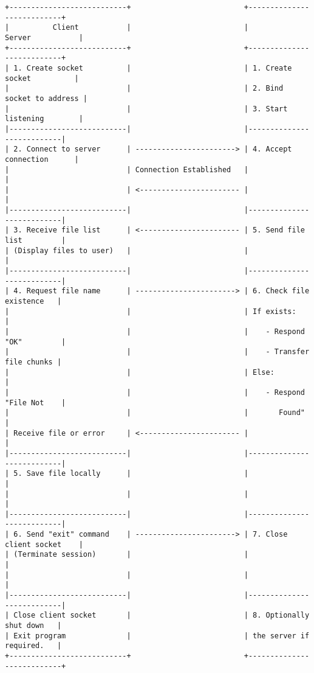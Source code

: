 \documentclass{article}
\begin{document}
\begin{verbatim}
+---------------------------+                          +---------------------------+
|          Client           |                          |          Server           |
+---------------------------+                          +---------------------------+
| 1. Create socket          |                          | 1. Create socket          |
|                           |                          | 2. Bind socket to address |
|                           |                          | 3. Start listening        |
|---------------------------|                          |---------------------------|
| 2. Connect to server      | -----------------------> | 4. Accept connection      |
|                           | Connection Established   |                           |
|                           | <----------------------- |                           |
|---------------------------|                          |---------------------------|
| 3. Receive file list      | <----------------------- | 5. Send file list         |
| (Display files to user)   |                          |                           |
|---------------------------|                          |---------------------------|
| 4. Request file name      | -----------------------> | 6. Check file existence   |
|                           |                          | If exists:                |
|                           |                          |    - Respond "OK"         |
|                           |                          |    - Transfer file chunks |
|                           |                          | Else:                     |
|                           |                          |    - Respond "File Not    |
|                           |                          |       Found"              |
| Receive file or error     | <----------------------- |                           |
|---------------------------|                          |---------------------------|
| 5. Save file locally      |                          |                           |
|                           |                          |                           |
|---------------------------|                          |---------------------------|
| 6. Send "exit" command    | -----------------------> | 7. Close client socket    |
| (Terminate session)       |                          |                           |
|                           |                          |                           |
|---------------------------|                          |---------------------------|
| Close client socket       |                          | 8. Optionally shut down   |
| Exit program              |                          | the server if required.   |
+---------------------------+                          +---------------------------+
\end{verbatim}
\end{document}
